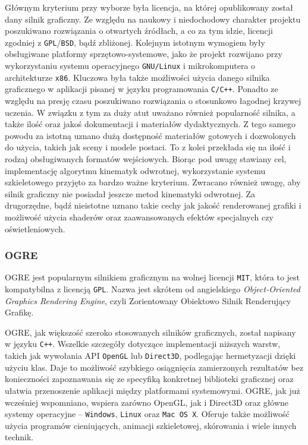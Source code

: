 \documentclass[11pt]{mwrep}
\begin{document}
    Głównym kryterium przy wyborze była licencja, na której opublikowany został dany silnik graficzny. Ze względu na naukowy i niedochodowy charakter projektu poszukiwano rozwiązania o otwartych źródłach, a co za tym idzie, licencji zgodniej z \texttt{GPL}/\texttt{BSD}, bądź zbliżonej. Kolejnym istotnym wymogiem były obsługiwane platformy sprzętowo-sys\-te\-mo\-we, jako że projekt rozwijano przy wykorzystaniu systemu operacyjnego \texttt{GNU/Linux} i mikrokomputera o architekturze \texttt{x86}.  Kluczowa była także możliwości użycia danego silnika graficznego w aplikacji pisanej w języku programowania \texttt{C/C++}. Ponadto ze względu na presję czasu poszukiwano rozwiązania o stosunkowo łagodnej krzywej uczenia. W związku z tym za duży atut uważano również popularność silnika, a także ilość oraz jakoś dokumentacji i materiałów dydaktycznych. Z tego samego powodu za istotną uznano dużą dostępność materiałów gotowych i dozwolonych do użycia, takich jak sceny i modele postaci. To z kolei przekłada się na ilość i rodzaj obsługiwanych formatów wejściowych. Biorąc pod uwagę stawiany cel, implementację algorytmu kinematyk odwrotnej, wykorzystanie systemu szkieletowego przyjęto za bardzo ważne kryterium. Zwracano również uwagę, aby silnik graficzny nie posiadał jeszcze metod kinematyki odwrotnej. Za drugorzędne, bądź nieistotne uznano takie cechy jak jakość renderowanej grafiki i możliwość użycia shaderów oraz zaawansowanych efektów specjalnych czy oświetleniowych.

 
      \subsubsection{OGRE}

      OGRE jest popularnym silnikiem graficznym na wolnej licencji \texttt{MIT}, która to jest kompatybilna z licencją \texttt{GPL}. Nazwa jest skrótem od angielskiego \textit{Object-Oriented Graphics Rendering Engine}, czyli Zorientowany Obiektowo Silnik Renderujący Grafikę.

      OGRE, jak większość szeroko stosowanych silników graficznych, został napisany w języku \texttt{C++}. Wszelkie szczegóły dotyczące implementacji niższych warstw, takich jak wywołania API \texttt{OpenGL} lub \texttt{Direct3D}, podlegając hermetyzacji dzięki użyciu klas. Daje to możliwość szybkiego osiągnięcia zamierzonych rezultatów bez konieczności zapoznawania się ze specyfiką konkretnej biblioteki graficznej oraz ułatwia przenoszenie aplikacji między platformami systemowymi. OGRE, jak już wcześniej wspomniano, wspiera zarówno OpenGL, jak i Direct3D oraz główne systemy operacyjne -- \texttt{Windows}, \texttt{Linux} oraz \texttt{Mac OS X}. Oferuje także możliwość użycia programów cieniujących, animacji szkieletowej, skórowania i wiele innych technik. 
\end{document}
